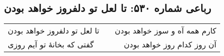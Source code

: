 \begin{center}
\section*{رباعی شماره ۵۳۰: تا لعل تو دلفروز خواهد بودن}
\label{sec:sh530}
\begin{longtable}{l p{0.5cm} r}
تا لعل تو دلفروز خواهد بودن
&&
کارم همه آه و سوز خواهد بودن
\\
گفتی که بخانهٔ تو آیم روزی
&&
آن روز کدام روز خواهد بودن
\\
\end{longtable}
\end{center}
